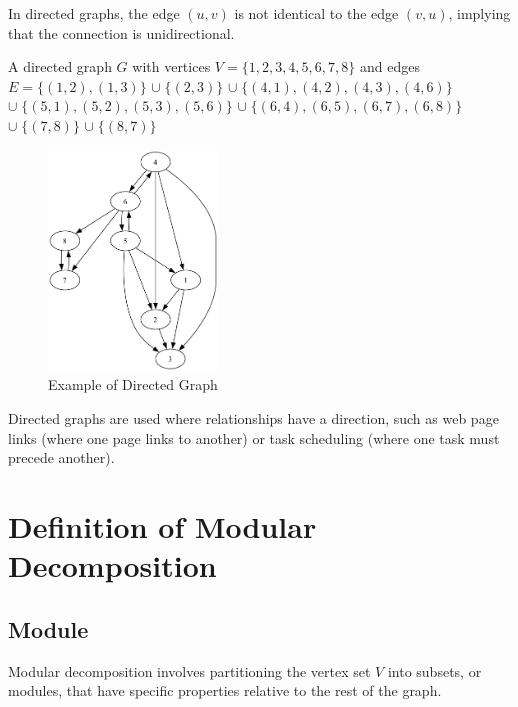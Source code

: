 In directed graphs, the edge $(u, v)$ is not identical to the edge $(v, u)$, implying that the connection is unidirectional.

\begin{myex}
    A directed graph $G$ with vertices $V = \{1, 2, 3, 4, 5, 6, 7, 8\}$ and edges \\
    $E = \{(1, 2), (1, 3)\}$
    $\cup \; \{(2, 3)\}$
    $\cup \; \{(4 , 1), (4, 2), (4, 3), (4, 6)\}$
    $\cup \; \{(5 , 1), (5, 2), (5, 3), (5, 6)\}$
    $\cup \; \{(6, 4), (6, 5), (6, 7), (6, 8)\}$
    $\cup \; \{(7, 8)\}$
    $\cup \; \{(8, 7)\}$

    \begin{figure}[!h]
        \centering
        \includegraphics[width=0.40\textwidth]{images/graphs/digraph_ex1_without_label}
        \caption{Example of Directed Graph}
        \label{fig:example-directed-graph}
    \end{figure}
\end{myex}

Directed graphs are used where relationships have a direction, such as web page links (where one page links to another) or task scheduling (where one task must precede another).


\section{Definition of Modular Decomposition}\label{sec:definition-of-modular-decomposition}

\subsection*{Module}\label{subsec:module}

Modular decomposition involves partitioning the vertex set $V$ into subsets, or modules, that have specific properties relative to the rest of the graph.

